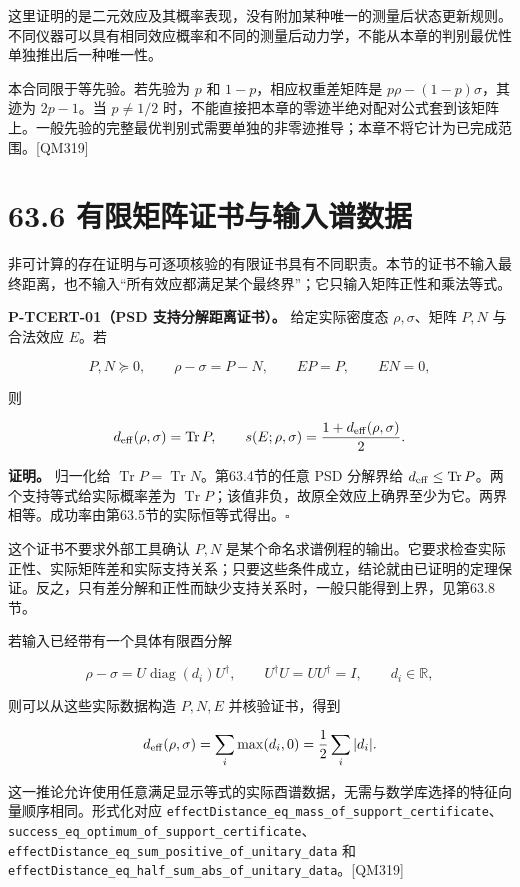 \documentclass[
  11pt,
  oneside]{book}
\begin{document}
这里证明的是二元效应及其概率表现，没有附加某种唯一的测量后状态更新规则。不同仪器可以具有相同效应概率和不同的测量后动力学，不能从本章的判别最优性单独推出后一种唯一性。

本合同限于等先验。若先验为 \(p\) 和 \(1-p\)，相应权重差矩阵是
\(p\rho-(1-p)\sigma\)，其迹为 \(2p-1\)。当 \(p\ne1/2\)
时，不能直接把本章的零迹半绝对配对公式套到该矩阵上。一般先验的完整最优判别式需要单独的非零迹推导；本章不将它计为已完成范围。{[}QM319{]}

\section{63.6 有限矩阵证书与输入谱数据}

非可计算的存在证明与可逐项核验的有限证书具有不同职责。本节的证书不输入最终距离，也不输入``所有效应都满足某个最终界''；它只输入矩阵正性和乘法等式。

\protect\hypertarget{p-tcert-01}{}{}

\textbf{P-TCERT-01（PSD 支持分解距离证书）。} 给定实际密度态
\(\rho,\sigma\)、矩阵 \(P,N\) 与合法效应 \(E\)。若

\[
P,N\succeq0,\qquad
\rho-\sigma=P-N,\qquad
EP=P,\qquad EN=0,
\]

则

\[
d_{\rm eff}(\rho,\sigma)=\operatorname{Tr}P,
\qquad
s(E;\rho,\sigma)=\frac{1+d_{\rm eff}(\rho,\sigma)}2.
\]

\textbf{证明。} 归一化给
\(\operatorname{Tr}P=\operatorname{Tr}N\)。第63.4节的任意 PSD 分解界给
\(d_{\rm eff}\le\operatorname{Tr}P\)。两个支持等式给实际概率差为
\(\operatorname{Tr}P\)；该值非负，故原全效应上确界至少为它。两界相等。成功率由第63.5节的实际恒等式得出。\(\square\)

这个证书不要求外部工具确认 \(P,N\)
是某个命名求谱例程的输出。它要求检查实际正性、实际矩阵差和实际支持关系；只要这些条件成立，结论就由已证明的定理保证。反之，只有差分解和正性而缺少支持关系时，一般只能得到上界，见第63.8节。

若输入已经带有一个具体有限酉分解

\[
\rho-\sigma=U\operatorname{diag}(d_i)U^\dagger,
\qquad U^\dagger U=UU^\dagger=I,
\qquad d_i\in\mathbb R,
\]

则可以从这些实际数据构造 \(P,N,E\) 并核验证书，得到

\[
d_{\rm eff}(\rho,\sigma)
=\sum_i\max(d_i,0)
=\frac12\sum_i|d_i|.
\]

这一推论允许使用任意满足显示等式的实际酉谱数据，无需与数学库选择的特征向量顺序相同。形式化对应
\texttt{effect\allowbreak Distance\_\allowbreak eq\_\allowbreak mass\_\allowbreak of\_\allowbreak support\_\allowbreak certificate}、\allowbreak \texttt{success\_\allowbreak eq\_\allowbreak optimum\_\allowbreak of\_\allowbreak support\_\allowbreak certificate}、\allowbreak \texttt{effect\allowbreak Distance\_\allowbreak eq\_\allowbreak sum\_\allowbreak positive\_\allowbreak of\_\allowbreak unitary\_\allowbreak data}
和
\texttt{effect\allowbreak Distance\_\allowbreak eq\_\allowbreak half\_\allowbreak sum\_\allowbreak abs\_\allowbreak of\_\allowbreak unitary\_\allowbreak data}。{[}QM319{]}
\end{document}
